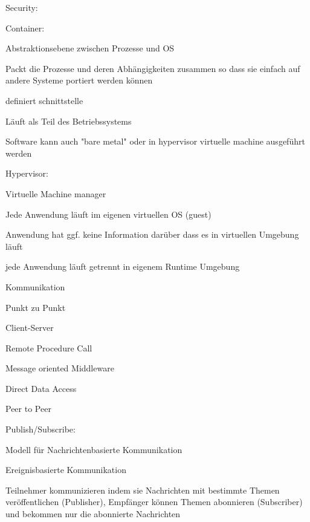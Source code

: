 \begin{notes}
    \item Security: \cite{Mahmud2020}
    \begin{notes}
        \item Container: \cite{Costa2022}
        \begin{notes}
            \item Abstraktionsebene zwischen Prozesse und OS
            \item Packt die Prozesse und deren Abhängigkeiten zusammen so dass sie einfach auf andere Systeme portiert werden können
            \item definiert schnittstelle
            \item Läuft als Teil des Betriebssystems
            \item Software kann auch "bare metal" oder in hypervisor virtuelle machine ausgeführt werden
        \end{notes}
        \item Hypervisor:
        \begin{notes}
            \item Virtuelle Machine manager
            \item Jede Anwendung läuft im eigenen virtuellen OS (guest)
            \item Anwendung hat ggf. keine Information darüber dass es in virtuellen Umgebung läuft
            \item jede Anwendung läuft getrennt in eigenem Runtime Umgebung
        \end{notes}
    \end{notes}
    \item Kommunikation
    \begin{notes}
        \item Punkt zu Punkt
        \item Client-Server
        \item Remote Procedure Call
        \item Message oriented Middleware
        \item Direct Data Access
        \item Peer to Peer
        \item Publish/Subscribe:
            \begin{notes}
                \item Modell für Nachrichtenbasierte Kommunikation \cite{MadeWirawan2018}
                \item Ereignisbasierte Kommunikation
                \item Teilnehmer kommunizieren indem sie Nachrichten mit bestimmte Themen veröffentlichen (Publisher), Empfänger können Themen abonnieren (Subscriber) und bekommen nur die abonnierte Nachrichten

\end{notes}
\end{notes}
\end{notes}
